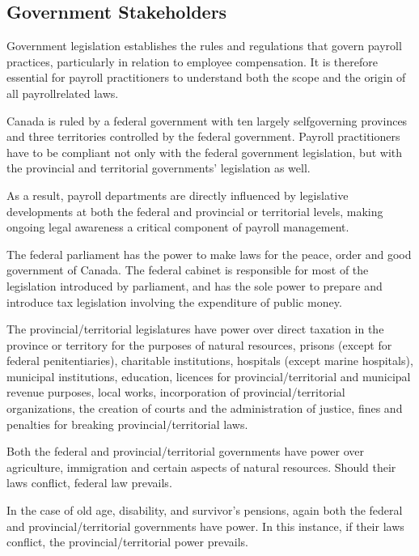 \documentclass[letterpaper,10pt,english]{sphinxmanual}
\begin{document}
\subsection{Government Stakeholders}
\label{\detokenize{compliance:government-stakeholders}}
\sphinxAtStartPar
Government legislation establishes the rules and regulations that govern payroll practices, particularly in relation to
employee compensation. It is therefore essential for payroll practitioners to understand both the scope and the origin of all
payroll\sphinxhyphen{}related laws.

\sphinxAtStartPar
Canada is ruled by a federal government with ten largely self\sphinxhyphen{}governing provinces and three
territories controlled by the federal government. Payroll practitioners have to be compliant
not only with the federal government legislation, but with the provincial and territorial
governments’ legislation as well.

\sphinxAtStartPar
As a result, payroll departments are directly influenced by legislative developments at both the federal and provincial or
territorial levels, making ongoing legal awareness a critical component of payroll management.

\sphinxAtStartPar
The federal parliament has the power to make laws for the peace, order and good government
of Canada. The federal cabinet is responsible for most of the legislation introduced by
parliament, and has the sole power to prepare and introduce tax legislation involving the
expenditure of public money.

\sphinxAtStartPar
The provincial/territorial legislatures have power over direct taxation in the province or
territory for the purposes of natural resources, prisons (except for federal penitentiaries),
charitable institutions, hospitals (except marine hospitals), municipal institutions, education,
licences for provincial/territorial and municipal revenue purposes, local works, incorporation
of provincial/territorial organizations, the creation of courts and the administration of justice,
fines and penalties for breaking provincial/territorial laws.

\sphinxAtStartPar
Both the federal and provincial/territorial governments have power over agriculture,
immigration and certain aspects of natural resources. Should their laws conflict, federal law
prevails.

\sphinxAtStartPar
In the case of old age, disability, and survivor’s pensions, again both the federal and
provincial/territorial governments have power. In this instance, if their laws conflict, the
provincial/territorial power prevails.
\end{document}
